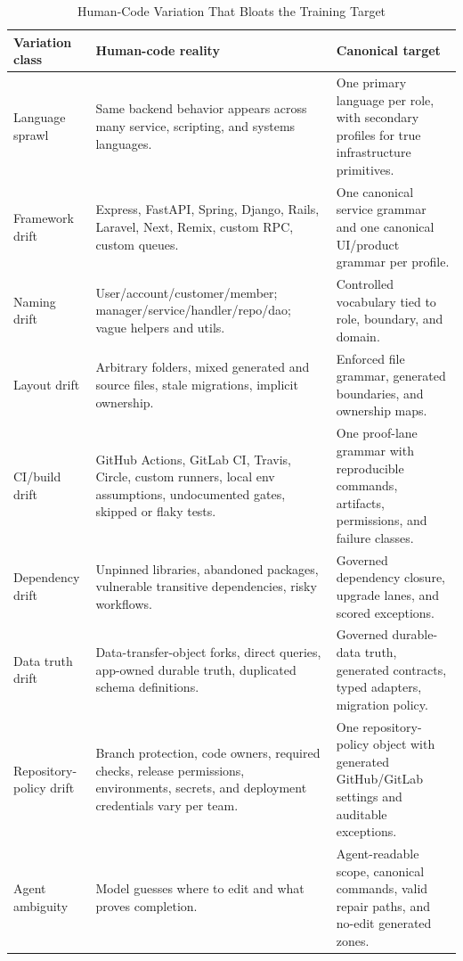 \begin{table}[t]
\caption{Human-Code Variation That Bloats the Training Target}
\label{tab:chaos}
\centering
\footnotesize
\begin{tabularx}{\textwidth}{p{}X X}
\toprule
Variation class & Human-code reality & Canonical target \\
\midrule
Language sprawl & Same backend behavior appears across many service, scripting, and systems languages. & One primary language per role, with secondary profiles for true infrastructure primitives. \\
Framework drift & Express, FastAPI, Spring, Django, Rails, Laravel, Next, Remix, custom RPC, custom queues. & One canonical service grammar and one canonical UI/product grammar per profile. \\
Naming drift & User/account/customer/member; manager/service/handler/repo/dao; vague helpers and utils. & Controlled vocabulary tied to role, boundary, and domain. \\
Layout drift & Arbitrary folders, mixed generated and source files, stale migrations, implicit ownership. & Enforced file grammar, generated boundaries, and ownership maps. \\
CI/build drift & GitHub Actions, GitLab CI, Travis, Circle, custom runners, local env assumptions, undocumented gates, skipped or flaky tests. & One proof-lane grammar with reproducible commands, artifacts, permissions, and failure classes. \\
Dependency drift & Unpinned libraries, abandoned packages, vulnerable transitive dependencies, risky workflows. & Governed dependency closure, upgrade lanes, and scored exceptions. \\
Data truth drift & Data-transfer-object forks, direct queries, app-owned durable truth, duplicated schema definitions. & Governed durable-data truth, generated contracts, typed adapters, migration policy. \\
Repository-policy drift & Branch protection, code owners, required checks, release permissions, environments, secrets, and deployment credentials vary per team. & One repository-policy object with generated GitHub/GitLab settings and auditable exceptions. \\
Agent ambiguity & Model guesses where to edit and what proves completion. & Agent-readable scope, canonical commands, valid repair paths, and no-edit generated zones. \\
\bottomrule
\end{tabularx}
\end{table}


